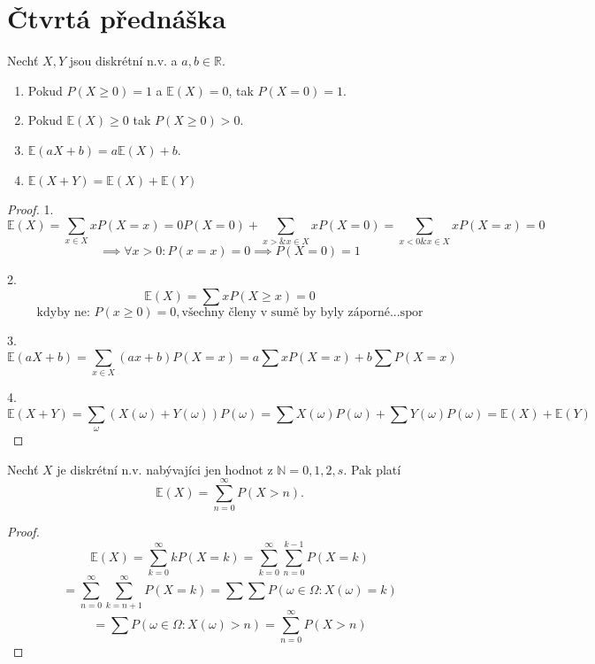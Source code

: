 \documentclass[../main.tex]{subfiles}
\begin{document}
\section{Čtvrtá přednáška}

\begin{theorem}
    Nechť $X,Y$ jsou diskrétní n.v. a $a,b \in \mathbb{R}$.
    \begin{enumerate}
        \item Pokud $P(X\geq 0) = 1$ a $\mathbb{E}(X) = 0$, tak $P(X=0)=1$.
        \item Pokud $\mathbb{E}(X) \geq 0$ tak $P(X\geq 0) > 0.$
        \item $\mathbb{E}(a X + b) = a \mathbb{E}(X) + b$.
        \item $\mathbb{E}(X+Y) = \mathbb{E}(X) + \mathbb{E}(Y)$
    \end{enumerate}
\end{theorem}
\begin{proof}
    1.\\
    \[\mathbb{E}(X) = \sum_{x \in X} x  P(X = x) = 0  P(X = 0) + \sum_{x > \& x \in X} x  P(X = 0) = 
    \sum_{x<0 \& x\in X} x P(X=x) = 0\]
    \[\implies \forall x > 0 : P(x = x) = 0 \implies P(X = 0) = 1\]

    2.\\
    \[\mathbb{E}(X) = \sum x P(X\geq x) = 0\]
    \[\text{kdyby ne: } P(x\geq 0) = 0, \text{všechny členy v sumě by byly záporné...spor}\]

    3.\\
    \[\mathbb{E}(a X+b) = \sum_{x\in X} (a x + b)P(X=x) = a\sum xP(X=x) + b\sum P(X=x)\]

    4.\\
    \[\mathbb{E}(X+Y) = \sum_{\omega}(X(\omega)+Y(\omega))P({\omega}) = \sum X(\omega)P({\omega})
    + \sum Y(\omega)P({\omega}) = \mathbb{E}(X) + \mathbb{E}(Y)\]
\end{proof}

\begin{theorem}
    Nechť $X$ je diskrétní n.v. nabývajíci jen hodnot z $\mathbb{N} = {0,1,2,s}$. Pak platí
    \[\mathbb{E}(X) = \sum^\infty_{n = 0} P(X>n).\]
\end{theorem}
\begin{proof}
    \[\mathbb{E}(X) = \sum^\infty_{k=0} kP(X=k) = \sum^\infty_{k=0} \sum^{k-1}_{n=0} P(X=k)\]
    \[= \sum_{n=0}^\infty \sum_{k=n+1}^\infty P(X=k) = \sum \sum P({\omega \in \Omega : X(\omega) = k})\]
    \[= \sum P({\omega \in \Omega : X(\omega) > n}) = \sum^\infty_{n=0} P(X>n)\]
\end{proof}
\end{document}
